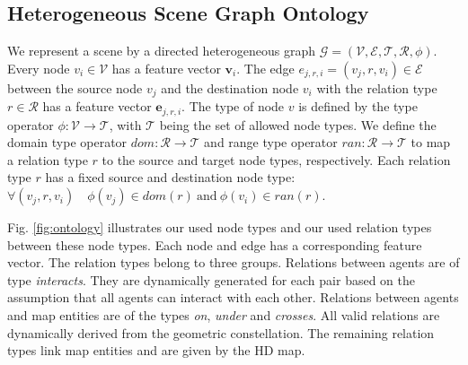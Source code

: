 \documentclass[letterpaper, 10 pt, journal, twoside]{IEEEtran}
\begin{document}
\subsection{Heterogeneous Scene Graph Ontology}
We represent a scene by a directed heterogeneous graph $\mathcal{G} = ( \mathcal{V}, \mathcal{E}, \mathcal{T}, \mathcal{R}, \phi ) $.
Every node $v_i \in \mathcal{V}$ has a feature vector $\mathbf{v}_i$.
The edge $e_{j,r,i} = (v_j, r, v_i) \in \mathcal{E}$ between the source node $v_j$ and the destination node $v_i$ with the relation type $r \in \mathcal{R}$ has a feature vector $\mathbf{e}_{j,r,i}$.
The type of node $v$ is defined by the type operator $\phi: \mathcal{V} \to \mathcal{T}$, with $\mathcal{T}$ being the set of allowed node types.
We define the domain type operator $dom: \mathcal{R} \to \mathcal{T}$ and range type operator $ran: \mathcal{R} \to \mathcal{T}$ to map a relation type $r$ to the source and target node types, respectively.
Each relation type $r$ has a fixed source and destination node type: $\forall (v_j,r,v_i) \quad \phi(v_j) \in dom(r) \ \text{and} \ \phi(v_i) \in ran(r)$.

Fig. \ref{fig:ontology} illustrates our used node types and our used relation types between these node types.
Each node and edge has a corresponding feature vector.
The relation types belong to three groups.
Relations between agents are of type \textit{interacts}.
They are dynamically generated for each pair based on the assumption that all agents can interact with each other.
Relations between agents and map entities are of the types \textit{on}, \textit{under} and \textit{crosses}.
All valid relations are dynamically derived from the geometric constellation.
The remaining relation types link map entities and are given by the HD map.
\end{document}
